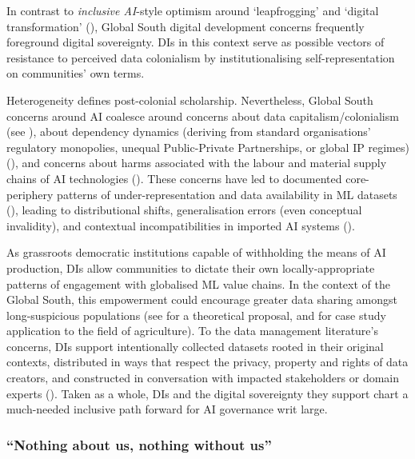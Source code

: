 In contrast to \textit{inclusive AI}-style optimism around `leapfrogging' and `digital transformation' (\cite{singhDigitalIndustrialisationDeveloping, borokini2021ExploringthefutureofdatagovernaceinAfricaDataStewardship}), Global South digital development concerns frequently foreground digital sovereignty. DIs in this context serve as possible vectors of resistance to perceived data colonialism by institutionalising self-representation on communities' own terms.

Heterogeneity defines post-colonial scholarship. Nevertheless, Global South concerns around AI coalesce around concerns about data capitalism/colonialism (see \textcite{couldry2020CostsConnectionHow, ricaurte2019DataEpistemologiesColoniality, graham2014CriticalPerspectivePotential}), about dependency dynamics (deriving from standard organisations' regulatory monopolies, unequal Public-Private Partnerships, or global IP regimes) (\cite{png2022TensionsSouthNorth}), and concerns about harms associated with the labour and material supply chains of AI technologies (\cite{2023PowerEcologyDiplomacy}). These concerns have led to documented core-periphery patterns of under-representation and data availability in ML datasets (\cite{graham2014CriticalPerspectivePotential}), leading to distributional shifts, generalisation errors (even conceptual invalidity), and contextual incompatibilities in imported AI systems (\cite{smith2018ArtificialIntelligenceHuman}).

As grassroots democratic institutions capable of withholding the means of AI production,  DIs allow communities to dictate their own locally-appropriate patterns of engagement with globalised ML value chains. In the context of the Global South, this empowerment could encourage greater data sharing amongst long-suspicious populations (see \textcite{olorunju2023AfricanDataTrusts} for a theoretical proposal, and \textcite{baarbe2019ProposedAgriculturalData} for case study application to the field of agriculture). To the data management literature's concerns, DIs support intentionally collected datasets rooted in their original contexts, distributed in ways that respect the privacy, property and rights of data creators, and constructed in conversation with impacted stakeholders or domain experts (\cite{paullada2021DataItsDis}). Taken as a whole, DIs and the digital sovereignty they support chart a much-needed inclusive path forward for AI governance writ large.

\subsubsection*{“Nothing about us, nothing without us”}

